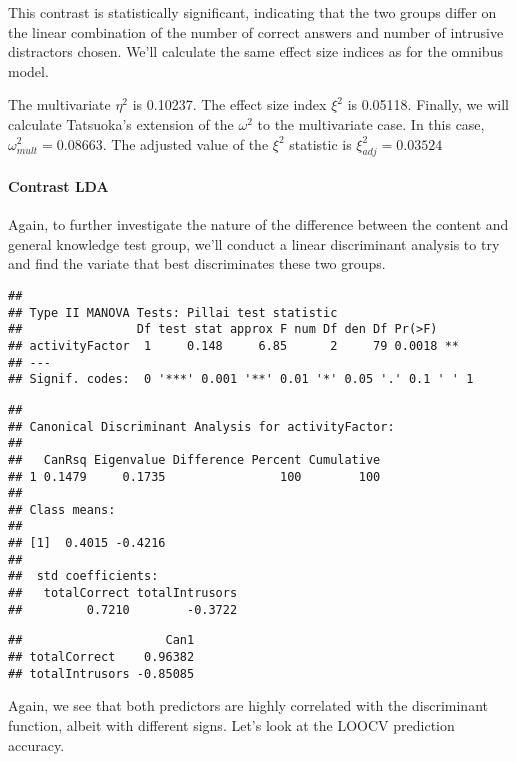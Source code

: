 \documentclass[12pt,]{article}
\let\oldparagraph\paragraph
\renewcommand{\paragraph}[1]{\oldparagraph{#1}\mbox{}}
\begin{document}
This contrast is statistically significant, indicating that the two
groups differ on the linear combination of the number of correct answers
and number of intrusive distractors chosen. We'll calculate the same
effect size indices as for the omnibus model.

The multivariate \(\eta^2\) is 0.10237. The effect size index \(\xi^2\)
is 0.05118. Finally, we will calculate Tatsuoka's
\citep[1970; according to][]{huberty_applied_2006} extension of the
\(\omega^2\) to the multivariate case. In this case,
\(\omega^2_{mult} = 0.08663\). The adjusted value of the \(\xi^2\)
statistic is \(\xi^2_{adj} = 0.03524\)

\hypertarget{contrast-lda}{%
\paragraph{Contrast LDA}\label{contrast-lda}}

Again, to further investigate the nature of the difference between the
content and general knowledge test group, we'll conduct a linear
discriminant analysis to try and find the variate that best
discriminates these two groups.

\begin{verbatim}
## 
## Type II MANOVA Tests: Pillai test statistic
##                Df test stat approx F num Df den Df Pr(>F)   
## activityFactor  1     0.148     6.85      2     79 0.0018 **
## ---
## Signif. codes:  0 '***' 0.001 '**' 0.01 '*' 0.05 '.' 0.1 ' ' 1
\end{verbatim}

\begin{verbatim}
## 
## Canonical Discriminant Analysis for activityFactor:
## 
##   CanRsq Eigenvalue Difference Percent Cumulative
## 1 0.1479     0.1735                100        100
## 
## Class means:
## 
## [1]  0.4015 -0.4216
## 
##  std coefficients:
##   totalCorrect totalIntrusors 
##         0.7210        -0.3722
\end{verbatim}

\begin{verbatim}
##                    Can1
## totalCorrect    0.96382
## totalIntrusors -0.85085
\end{verbatim}

Again, we see that both predictors are highly correlated with the
discriminant function, albeit with different signs. Let's look at the
LOOCV prediction accuracy.
\end{document}
